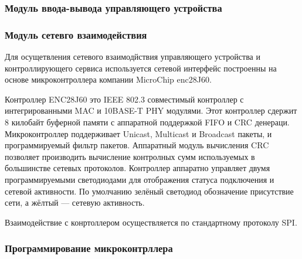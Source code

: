 \subsubsection{Модуль ввода-вывода управляющего устройства}

\subsubsection{Модуль сетевго взаимодействия}
Для осущетвления сетевого взаимодйствия управляющего устройства и
контроллирующего сервиса используется сетевой интерфейс построенны
на основе микроконтроллера компании MicroChip enc28J60.

Контроллер ENC28J60 это IEEE 802.3 совместимый контроллер с интегрированными
MAC и 10BASE-T PHY модулями. Этот контроллер сдержит 8 килобайт буферной памяти
с аппаратной поддержкой FIFO и CRC денераци.
Микроконтроллер поддерживает Unicast, Multicast и Broadcast пакеты, и программируемый
фильтр пакетов.
Аппаратный модуль вычисления CRC позволяет производить вычисление контролных сумм
используемых в большинстве сетевых протоколов.
Контроллер аппаратно управляет двумя программируемыми светодиодами для
отображения статуса подключения и сетевой активности.
По умолчанию зелёный светодиод обозначение присутствие сети, а
жёлтый --- сетевую активность.

Взаимодействие с конртоллером осуществляется по стандартному
протоколу SPI.


\subsubsection{Программирование микроконтрллера}

